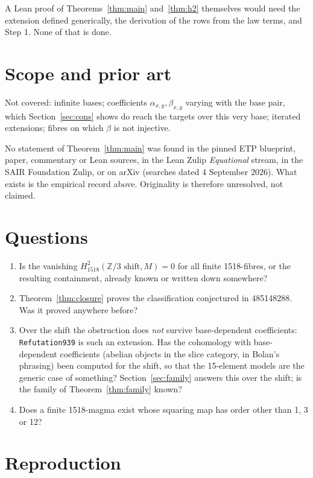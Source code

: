 \documentclass[11pt]{article}
\theoremstyle{remark}\newtheorem*{remark}{Remark}
\newcommand{\Z}{\mathbb{Z}}
\begin{document}
A Lean proof of Theorems~\ref{thm:main} and~\ref{thm:h2} themselves would need the extension defined generically, the derivation of the rows from the law terms, and Step 1. None of that is done.

\section{Scope and prior art}

Not covered: infinite bases; coefficients $\alpha_{x,y},\beta_{x,y}$ varying with the base pair, which Section~\ref{sec:cons} shows do reach the targets over this very base; iterated extensions; fibres on which $\beta$ is not injective.

No statement of Theorem~\ref{thm:main} was found in the pinned ETP blueprint, paper, commentary or Lean sources, in the Lean Zulip \emph{Equational} stream, in the SAIR Foundation Zulip, or on arXiv (searches dated 4 September 2026). What exists is the empirical record above. Originality is therefore unresolved, not claimed.

\section{Questions}

\begin{enumerate}
\item Is the vanishing $H^{2}_{1518}(\Z/3\text{ shift}, M)=0$ for all finite 1518-fibres, or the resulting containment, already known or written down somewhere?
\item Theorem~\ref{thm:closure} proves the classification conjectured in 485148288. Was it proved anywhere before?
\item Over the shift the obstruction does \emph{not} survive base-dependent coefficients: \texttt{Refutation939} is such an extension. Has the cohomology with base-dependent coefficients (abelian objects in the slice category, in Bolan's phrasing) been computed for the shift, so that the 15-element models are the generic case of something? Section~\ref{sec:family} answers this over the shift; is the family of Theorem~\ref{thm:family} known?
\item Does a finite 1518-magma exist whose squaring map has order other than 1, 3 or 12?
\end{enumerate}

\section{Reproduction}\label{sec:repro}
\end{document}
